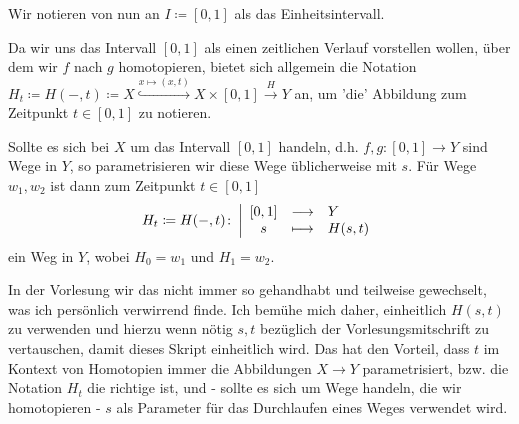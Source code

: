 \begin{dnotation}
    Wir notieren von nun an $I \coloneqq  [0,1]$ als das Einheitsintervall.
\end{dnotation}

\begin{notation**}
    Da wir uns das Intervall $[0,1]$ als einen zeitlichen Verlauf vorstellen wollen, über dem wir  $f$ nach  $g$ homotopieren, bietet sich allgemein die Notation  $H_t \coloneqq  H(-,t) \coloneqq  X \stackrel{x \mapsto (x,t)}{\hookrightarrow} X \times [0,1] \stackrel{H}{\longrightarrow}   Y$ an, um 'die' Abbildung zum Zeitpunkt $t\in [0,1]$ zu notieren. 

    Sollte es sich bei $X$ um das Intervall  $[0,1]$ handeln, d.h.  $f,g\colon [0,1] \to  Y$ sind Wege in $Y$, so parametrisieren wir diese Wege üblicherweise mit $s$. Für Wege  $w_1,w_2$  ist dann zum Zeitpunkt $t\in [0,1]$
        \begin{equation*}
            H_t \coloneqq H(-,t)\colon  \left| \begin{array}{c c l} 
            [0,1] & \longrightarrow & Y \\
        s & \longmapsto &  H(s,t)
        \end{array} \right.
    \end{equation*}
   ein Weg in $Y$, wobei  $H_0 = w_1$ und $H_1 = w_2$.

   In der Vorlesung wir das nicht immer so gehandhabt und teilweise gewechselt, was ich persönlich verwirrend finde. Ich bemühe mich daher, einheitlich $H(s,t)$ zu verwenden und hierzu wenn nötig  $s,t$ bezüglich der Vorlesungsmitschrift zu vertauschen, damit dieses Skript einheitlich wird. Das hat den Vorteil, dass  $t$ im Kontext von Homotopien immer die Abbildungen  $X\to Y$ parametrisiert, bzw. die Notation $H_t$ die richtige ist, und - sollte es sich um Wege handeln, die wir homotopieren -  $s$ als Parameter für das Durchlaufen eines Weges verwendet wird.
\end{notation**}

